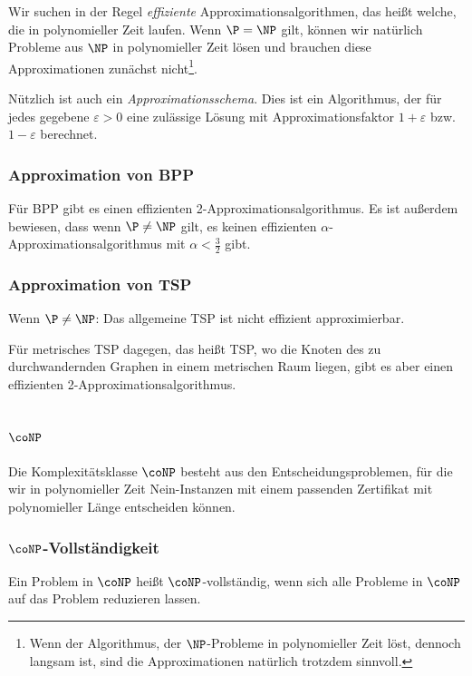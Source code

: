 \documentclass[a4paper,parskip=half*,DIV=7,fontsize=11pt]{scrartcl}
\begin{document}
Wir suchen in der Regel \emph{effiziente} Approximationsalgorithmen, das heißt welche, die in polynomieller Zeit laufen. Wenn $\P = \NP$ gilt, können wir natürlich Probleme aus $\NP$ in polynomieller Zeit lösen und brauchen diese Approximationen zunächst nicht\footnote{Wenn der Algorithmus, der $\NP$-Probleme in polynomieller Zeit löst, dennoch langsam ist, sind die Approximationen natürlich trotzdem sinnvoll.}.

Nützlich ist auch ein \emph{Approximationsschema}. Dies ist ein Algorithmus, der für jedes gegebene $\varepsilon > 0$ eine zulässige Lösung mit Approximationsfaktor $1 + \varepsilon$ bzw. $1 - \varepsilon$ berechnet.

\subsubsection{Approximation von BPP}

Für BPP gibt es einen effizienten 2-Approximationsalgorithmus. Es ist außerdem bewiesen, dass wenn $\P \neq \NP$ gilt, es keinen effizienten $\alpha$-Approximationsalgorithmus mit $\alpha < \frac{3}{2}$ gibt.

\subsubsection{Approximation von TSP}

Wenn $\P \neq \NP$: Das allgemeine TSP ist nicht effizient approximierbar.

Für metrisches TSP dagegen, das heißt TSP, wo die Knoten des zu durchwandernden Graphen in einem metrischen Raum liegen, gibt es aber einen effizienten 2-Approximationsalgorithmus.

\subsection[coNP]{$\coNP$}

Die Komplexitätsklasse $\coNP$ besteht aus den Entscheidungsproblemen, für die wir in polynomieller Zeit Nein-Instanzen mit einem passenden Zertifikat mit polynomieller Länge entscheiden können.

\subsubsection[coNP-Vollständigkeit]{$\coNP$-Vollständigkeit}

Ein Problem in $\coNP$ heißt $\coNP$-vollständig, wenn sich alle Probleme in $\coNP$ auf das Problem reduzieren lassen.
\end{document}
